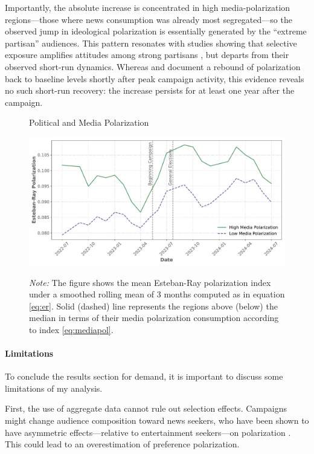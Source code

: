 \documentclass[12pt]{article}
\begin{document}
Importantly, the absolute increase is concentrated in high media-polarization regions—those where news consumption was already most segregated—so the observed jump in ideological polarization is essentially generated by the “extreme partisan” audiences. This pattern resonates with studies showing that selective exposure amplifies attitudes among strong partisans \citep{levendusky}, but departs from their observed short-run dynamics. Whereas \citet{levendusky} and \citet{Hernndez2020AffectivePA} document a rebound of polarization back to baseline levels shortly after peak campaign activity, this evidence reveals no such short-run recovery: the increase persists for at least one year after the campaign.




\begin{figure}[!htbp]

	\centering
		\caption{Political and Media Polarization}
	\includegraphics[width=150mm]{figures/er_polarization_stata_group}
				\label{fig:er1}
	\caption*{\textit{Note:} \small The figure shows the mean Esteban-Ray polarization index under a smoothed rolling mean of 3 months computed as in equation \ref{eq:er}.  Solid (dashed) line represents the regions above (below) the median in terms of their media polarization consumption according to index \ref{eq:mediapol}.   }

\end{figure}

\paragraph{Limitations}

To conclude the results section for demand, it is important to discuss some limitations of my analysis.

First, the use of aggregate data cannot rule out selection effects. Campaigns might change audience composition toward news seekers, who have been shown to have asymmetric effects—relative to entertainment seekers—on polarization \citep{levendusky,arceneaux_johnson_2013}. This could lead to an overestimation of preference polarization. 
\end{document}
